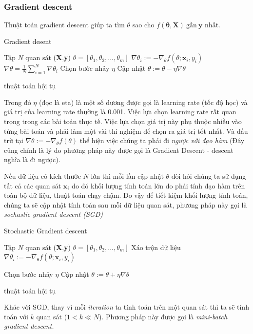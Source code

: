 \subsubsection{Gradient descent}
\hspace{5mm} Thuật toán gradient descent giúp ta tìm $\theta$ sao cho $f(\mathbf{\theta},\textbf{X})~\text{gần}~\textbf{y}$ nhất.
\begin{algorithm}[H]
\label{alg:grad}
\caption{Gradient desent}
\begin{algorithmic}[1]
\REQUIRE Tập $N$ quan sát (\textbf{X},\textbf{y})
\REQUIRE $\theta=[\theta_1,\theta_2,...,\theta_m]$
\REPEAT 
{}
\STATE $\nabla \theta_i := - \nabla_{\theta}f(\theta;\textbf{x}_i,y_i)$
\ENDFOR
\STATE $\nabla \theta  =\frac{1}{N} \sum^{N}_{i=1}\nabla\theta_i$
\STATE Chọn bước nhảy $\eta$
\STATE Cập nhật $\theta := \theta - \eta\nabla\theta$

\UNTIL	thuật toán hội tụ
\end{algorithmic}
\end{algorithm}
Trong đó $\eta$ (đọc là eta) là một số dương được gọi là learning rate (tốc độ học) và giá trị của learning rate thường là 0.001. Việc lựa chọn learning rate rất quan trọng trong các bài toán thực tế. Việc lựa chọn giá trị này phụ thuộc nhiều vào từng bài toán và phải làm một vài thí nghiệm để chọn ra giá trị tốt nhất. Và dấu trừ tại $\nabla \theta := - \nabla_{\theta}f(\theta)$ thể hiện việc chúng ta phải đi\textit{ ngược với đạo hàm} (Đây cũng chính là lý do phương pháp này được gọi là Gradient Descent - descent nghĩa là đi ngược).\par
Nếu dữ liệu có kích thước $N$ lớn thì mỗi lần cập nhật $\theta$ đòi hỏi chúng ta sử dụng tất cả các quan sát $\textbf{x}_i$ do đó khối lượng tính toán lớn do phải tính đạo hàm trên toàn bộ dữ liệu, thuật toán chạy chậm. Do vậy để tiết kiệm khối lượng tính toán, chúng ta sẽ cập nhật tính toán sau mỗi dữ liệu quan sát, phương pháp này gọi là \textit{sochastic gradient descent (SGD)}

\begin{algorithm}[H]
\label{alg:sgd}
\caption{Stochastic Gradient descent}
\begin{algorithmic}[1]
\REQUIRE Tập $N$ quan sát (\textbf{X},\textbf{y})
\REQUIRE  $\theta=[\theta_1,\theta_2,...,\theta_m]$
\REPEAT 
\STATE Xáo trộn dữ liệu
\STATE $\nabla \theta_i := - \nabla_{\theta}f(\theta;\textbf{x}_i,y_i)$

\STATE Chọn bước nhảy $\eta$
\STATE Cập nhật $\theta := \theta + \eta\nabla\theta$
	\STATE {}
\ENDIF
\ENDFOR

\UNTIL	thuật toán hội tụ
\end{algorithmic}
\end{algorithm}
Khác với SGD, thay vì mỗi \textit{iteration} ta tính toán trên một quan sát thì ta sẽ tính toán với $k$ quan sát ($1<k\ll N$). Phương pháp này được gọi là \textit{mini-batch gradient descent.}

